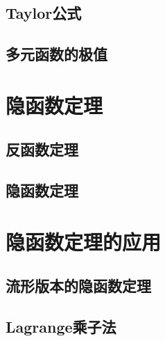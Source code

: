 \subsection{Taylor公式}

\subsection{多元函数的极值}

\newpage
\section{隐函数定理}

\subsection{反函数定理}

\subsection{隐函数定理}


\newpage
\section{隐函数定理的应用}

\subsection{流形版本的隐函数定理}

\subsection{Lagrange乘子法}